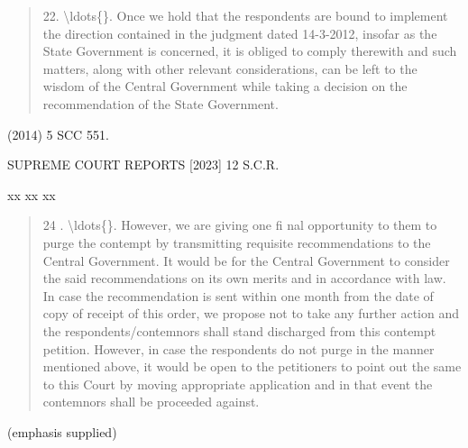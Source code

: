 \documentclass[12pt,a4paper]{article}
\newenvironment{judgequote}
  {\begin{quote}\small}
  {\end{quote}}
\begin{document}
\begin{judgequote}
22. \textbackslash{}ldots\{\}. Once we hold that the respondents are bound to implement the
direction contained in the judgment dated 14-3-2012, insofar as the
State Government is concerned, it is obliged to comply therewith and
such matters, along with other relevant considerations, can be left to
the wisdom of the Central Government while taking a decision on the
recommendation of the State Government.
\end{judgequote}

 (2014) 5 SCC 551.




 SUPREME COURT REPORTS [2023] 12 S.C.R.


\noindent xx xx xx


\begin{judgequote}
24 . \textbackslash{}ldots\{\}. However, we are giving one fi nal opportunity to them to purge
the contempt by transmitting requisite recommendations to the Central
Government. It would be for the Central Government to consider the
said recommendations on its own merits and in accordance with law.
In case the recommendation is sent within one month from the date
of copy of receipt of this order, we propose not to take any further
action and the respondents/contemnors shall stand discharged from
this contempt petition. However, in case the respondents do not purge
in the manner mentioned above, it would be open to the petitioners
to point out the same to this Court by moving appropriate application
and in that event the contemnors shall be proceeded against.
\end{judgequote}

\noindent (emphasis supplied)
\end{document}
